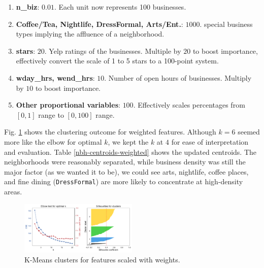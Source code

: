 \documentclass[compsoc]{IEEEtran}
\let\MYoriglatexcaption\caption
\renewcommand{\caption}[2][\relax]{\MYoriglatexcaption[#2]{#2}}
\begin{document}
\begin{enumerate}
	\item \textbf{n\_biz}: $0.01$. Each unit now represents 100 businesses.
	\item \textbf{Coffee/Tea, Nightlife, DressFormal, Arts/Ent.}: $1000$. special business types implying the affluence of a neighborhood.
	\item \textbf{stars}: $20$. Yelp ratings of the businesses. Multiple by $20$ to boost importance, effectively convert the scale of 1 to 5 stars to a 100-point system.
	\item \textbf{wday\_hrs, wend\_hrs}: $10$. Number of open hours of businesses. Multiply by $10$ to boost importance.
	\item \textbf{Other proportional variables}: $100$. Effectively scales percentages from $[0, 1]$ range to $[0, 100]$ range.
\end{enumerate}

Fig. \ref{nbh-kmeans-weighted} shows the clustering outcome for weighted features. Although $k = 6$ seemed more like the elbow for optimal $k$, we kept the $k$ at $4$ for ease of interpretation and evaluation. Table \ref{nbh-centroids-weighted} shows the updated centroids. The neighborhoods were reasonably separated, while business density was still the major factor (as we wanted it to be), we could see arts, nightlife, coffee places, and fine dining (\texttt{DressFormal}) are more likely to concentrate at high-density areas.

\begin{figure}[h]
  \hspace{-.5em}
    \includegraphics[width=0.5\textwidth]{nbh-kmeans-weighted}
  \caption{K-Means clusters for features scaled with weights.}
  \label{nbh-kmeans-weighted}
\end{figure}
\end{document}
